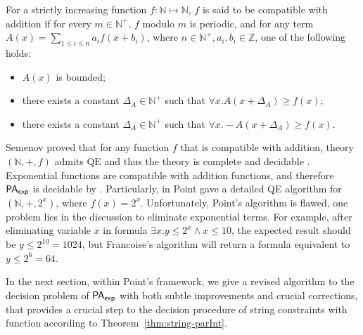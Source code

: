


\begin{definition}
    For a strictly increasing function $f:\mathbb{N}\mapsto \mathbb{N}$, 
    $f$ is said to be compatible with addition 
    if for every $m\in \mathbb{N}^+$,  $f$ modulo $m$ is periodic, 
    and for any term $A(x)=\sum_{1\le i\le n} a_i f(x+b_i)$, 
    where $n \in \mathbb{N}^+, a_i ,b_i \in \mathbb{Z}$,
    one of the following holds:
    \begin{itemize}
        \item $A(x)$ is bounded; 
        \item there exists a constant $\Delta_A\in \mathbb{N}^+$ such that 
        $\forall x. A(x+\Delta_A)\ge f(x)$;
        \item there exists a constant $\Delta_A\in \mathbb{N}^+$ such that 
        $\forall x. -A(x+\Delta_A)\ge f(x)$.
    \end{itemize}
\end{definition}


Semenov proved that for any function $f$ that is compatible with addition, 
theory $(\mathbb{N},+,f)$ admits QE  and thus the theory is complete and decidable \cite{Semenov84}. 
Exponential functions are compatible with addition functions, and therefore {${\sf PA}_{\sf exp}$} is decidable 
by \cite{Semenov84}.
Particularly, in \cite{Point86} Point gave a detailed QE algorithm for $(\mathbb{N},+,2^x)$, where $f(x)=2^x$.
Unfortunately, Point's algorithm is flawed, one problem 
 lies in the discussion to eliminate exponential terms. 
For example, after  eliminating variable $x$ in formula $\exists x. y\le 2^x \wedge x\le 10$,
the expected result should be $y\le 2^{10} =1024$,
but Francoise's algorithm will return a formula equivalent to $y \le 2^6=64$.

In the next section, within Point's framework, we give a revised algorithm
 to the decision problem of {${\sf PA}_{\sf exp}$} with 
both subtle improvements and crucial corrections, that 
provides a crucial step to the decision procedure of string constraints with {\parseInt} function according to 
Theorem~\ref{thm:string-parInt}. 

